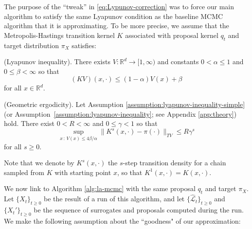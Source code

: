 The purpose of the ``tweak'' in \eqref{eq:Lypunov-correction} was to force our main algorithm to satisfy the same Lyapunov condition as the baseline MCMC algorithm that it is approximating. To be more precise, we assume that the Metropolis-Hastings transition kernel $K$ associated with proposal kernel $q_t$ and target distribution $\pi_{X}$ satisfies:
\begin{assumption} (Lyapunov inequality). There exists $V: \mathbb{R}^{d} \to [1, \infty)$ and constants $0 < \alpha \leq 1$ and $0 \leq \beta < \infty$ so that 
\begin{equation}
\label{eq:lyapunov}
    (K V)(x, \cdot) \leq (1-\alpha) V(x) + \beta
\end{equation}
for all $x \in \mathbb{R}^{d}$. 
\label{assumption:lyapunov-inequality-simple}
\end{assumption}
%
\begin{assumption}
(Geometric ergodicity). Let Assumption \ref{assumption:lyapunov-inequality-simple} (or Assumption~\ref{assumption:lyapunov-inequality}; see Appendix \ref{app:theory}) hold. There exist $0 < R < \infty$ and $0 \leq \gamma < 1$ so that 
\begin{equation}
    \sup_{x \, : \, V(x) \leq 4 \beta / \alpha}{\|K^{s}(x, \cdot) - \pi(\cdot)\|_{TV}} \leq R \gamma^s
\end{equation}
for all $s \geq 0$.
\label{assumption:geometric-ergodicity}
\end{assumption}
Note that we denote by $K^{s}(x,\cdot)$ the $s$-step transition density for a chain sampled from $K$ with starting point $x$, so that $K^{1}(x,\cdot) = K(x,\cdot)$. 

We now link to Algorithm \ref{alg:la-mcmc} with the same proposal $q_t$ and target $\pi_X$. Let $\{ X_{t}\}_{t \geq 0}$ be the result of a run of this algorithm, 
%
and let $\{ \widehat{\mathcal{L}}_{t}\}_{t \geq 0}$ and $\{ X_{t}' \}_{t \geq 0}$ be the sequence of surrogates and proposals computed during the run. We make the following assumption about the ``goodness" of our approximation:

